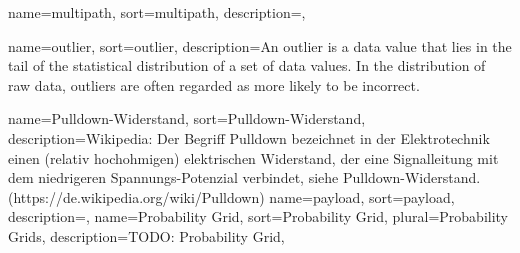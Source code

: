 {
	name={multipath}, sort={multipath},
	description={},
}


{
	name={outlier}, sort={outlier},
	description={An outlier is a data value that lies in the tail of the statistical distribution of a set of data values. In the distribution of raw data, outliers are often regarded as more likely to be incorrect.}
} %

{
	name={Pulldown-Widerstand},
	sort={Pulldown-Widerstand},
	description={Wikipedia: Der Begriff Pulldown bezeichnet in der Elektrotechnik einen (relativ hochohmigen) elektrischen Widerstand, der eine Signalleitung mit dem niedrigeren Spannungs-Potenzial verbindet, siehe Pulldown-Widerstand. (https://de.wikipedia.org/wiki/Pulldown)}
}
{
	name={payload}, sort={payload},
	description={},
}
{
	name={Probability Grid}, sort={Probability Grid}, plural={Probability Grids},
	description={TODO: Probability Grid},
}

